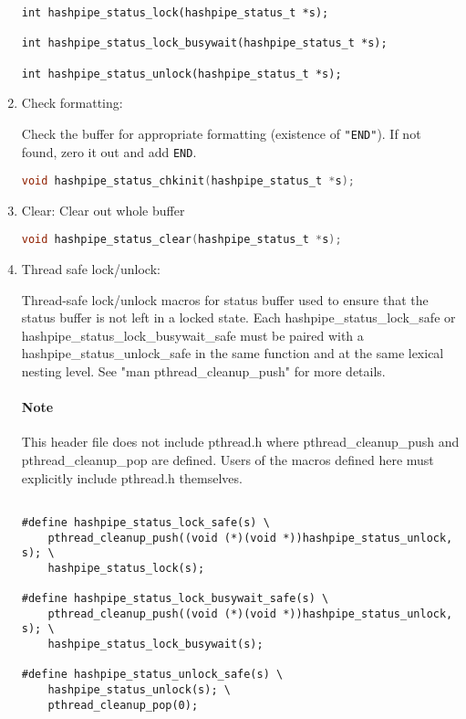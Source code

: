 \documentclass[12pt]{article}
\def\clst{\lstinline[basicstyle=\ttfamily,breaklines=true,language=C]}
\begin{document}
\begin{enumerate}
\begin{centering}
\begin{lstlisting}
int hashpipe_status_lock(hashpipe_status_t *s);

int hashpipe_status_lock_busywait(hashpipe_status_t *s);

int hashpipe_status_unlock(hashpipe_status_t *s);

\end{lstlisting}
\end{centering}

\item Check formatting:

Check the buffer for appropriate formatting (existence of {\tt "END"}).
If not found, zero it out and add {\tt END}.

\clst{void hashpipe_status_chkinit(hashpipe_status_t *s);}

\item Clear: Clear out whole buffer

\clst{void hashpipe_status_clear(hashpipe_status_t *s);}

\item Thread safe lock/unlock:

Thread-safe lock/unlock macros for status buffer used to ensure that the
status buffer is not left in a locked state.  Each hashpipe\_status\_lock\_safe
or hashpipe\_status\_lock\_busywait\_safe must be paired with a
hashpipe\_status\_unlock\_safe in the same function and at the same lexical
nesting level.  See "man pthread\_cleanup\_push" for more details.

\paragraph{Note} This header file does not include pthread.h where pthread\_cleanup\_push
and pthread\_cleanup\_pop are defined.  Users of the macros defined here
must explicitly include pthread.h themselves.

\begin{centering}
\begin{lstlisting}

#define hashpipe_status_lock_safe(s) \
    pthread_cleanup_push((void (*)(void *))hashpipe_status_unlock, s); \
    hashpipe_status_lock(s);

#define hashpipe_status_lock_busywait_safe(s) \
    pthread_cleanup_push((void (*)(void *))hashpipe_status_unlock, s); \
    hashpipe_status_lock_busywait(s);

#define hashpipe_status_unlock_safe(s) \
    hashpipe_status_unlock(s); \
    pthread_cleanup_pop(0);
\end{lstlisting}
\end{centering}

\end{enumerate}
\end{document}
